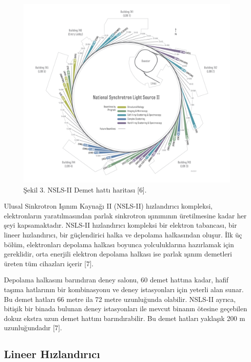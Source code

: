 \documentclass{article}
\begin{document}
	
	\begin{figure}[h]
 \centering
\includegraphics[width=16cm]{nsls2-beamlinesclock-jpg.jpg}
\caption*{Şekil 3. NSLS-II Demet hattı haritası [6].}
	\end{figure}
	
	Ulusal Sinkrotron Işınım Kaynağı II (NSLS-II) hızlandırıcı kompleksi, elektronların yaratılmasından parlak sinkrotron ışınımının üretilmesine kadar her şeyi kapsamaktadır. NSLS-II hızlandırıcı kompleksi bir elektron tabancası, bir lineer hızlandırıcı, bir güçlendirici halka ve depolama halkasından oluşur. İlk üç bölüm, elektronları depolama halkası boyunca yolculuklarına hazırlamak için gereklidir, orta enerjili elektron depolama halkası ise parlak ışınım demetleri üreten tüm cihazları içerir [7].
	
	Depolama halkasını barındıran deney salonu, 60 demet hattına kadar, hafif taşıma hatlarının bir kombinasyonu ve deney istasyonları için yeterli alan sunar. Bu demet hatları 66 metre ila 72 metre uzunluğunda olabilir. NSLS-II ayrıca, bitişik bir binada bulunan deney istasyonları ile mevcut binanın ötesine geçebilen dokuz ekstra uzun demet hattını barındırabilir. Bu demet hatları yaklaşık 200 m uzunluğundadır [7].
	
	\newpage
	
\subsection{Lineer Hızlandırıcı}
\end{document}

